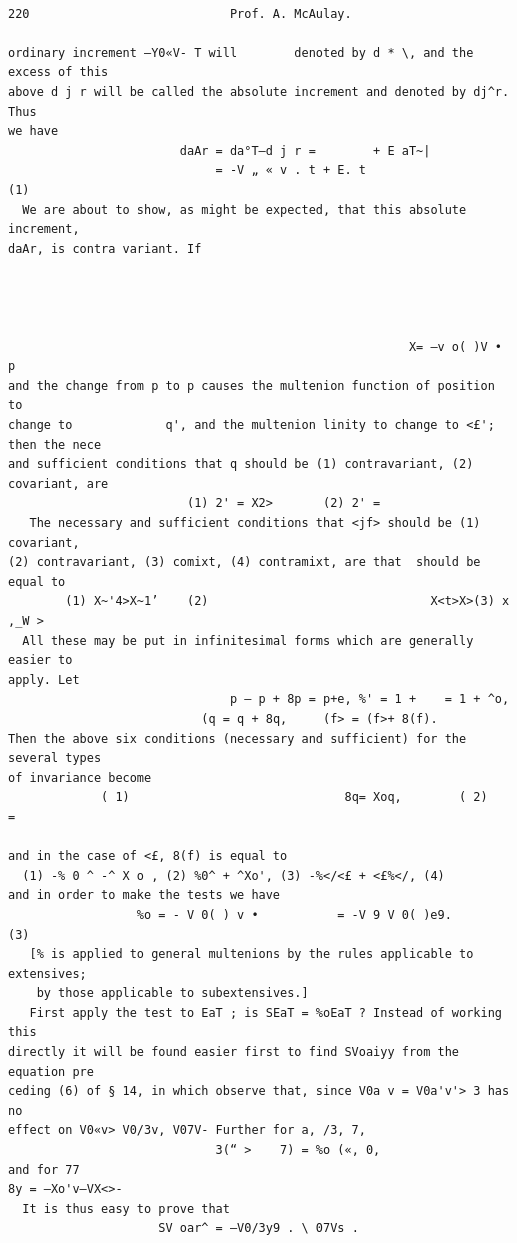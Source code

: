 \documentclass[10pt]{article}
\begin{document}
\clearpage
\begin{verbatim}

220                            Prof. A. McAulay.

ordinary increment —Y0«V- T will        denoted by d * \, and the excess of this
above d j r will be called the absolute increment and denoted by dj^r. Thus
we have
                        daAr = da°T—d j r =        + E aT~|
                             = -V „ « v . t + E. t                           (1)
  We are about to show, as might be expected, that this absolute increment,
daAr, is contra variant. If




                                                        X= —v o( )V • p
and the change from p to p causes the multenion function of position to
change to             q', and the multenion linity to change to <£'; then the nece
and sufficient conditions that q should be (1) contravariant, (2) covariant, are
                         (1) 2' = X2>       (2) 2' =
   The necessary and sufficient conditions that <jf> should be (1) covariant,
(2) contravariant, (3) comixt, (4) contramixt, are that  should be equal to
        (1) X~'4>X~1’    (2)                               X<t>X>(3) x ,_W >
  All these may be put in infinitesimal forms which are generally easier to
apply. Let
                               p — p + 8p = p+e, %' = 1 +    = 1 + ^o,
                           (q = q + 8q,     (f> = (f>+ 8(f).
Then the above six conditions (necessary and sufficient) for the several types
of invariance become
             ( 1)                              8q= Xoq,        ( 2)     =

and in the case of <£, 8(f) is equal to
  (1) -% 0 ^ -^ X o , (2) %0^ + ^Xo', (3) -%</<£ + <£%</, (4)
and in order to make the tests we have
                  %o = - V 0( ) v •           = -V 9 V 0( )e9.            (3)
   [% is applied to general multenions by the rules applicable to extensives;
    by those applicable to subextensives.]
   First apply the test to EaT ; is SEaT = %oEaT ? Instead of working this
directly it will be found easier first to find SVoaiyy from the equation pre­
ceding (6) of § 14, in which observe that, since V0a v = V0a'v'> 3 has no
effect on V0«v> V0/3v, V07V- Further for a, /3, 7,
                             3(“ >    7) = %o («, 0,
and for 77                                                            8y = —Xo'v—VX<>-
  It is thus easy to prove that
                     SV oar^ = —V0/3y9 . \ 07Vs .


\end{verbatim}
\end{document}
